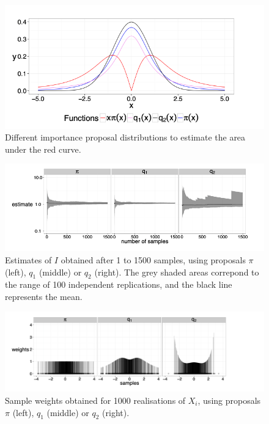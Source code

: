 \documentclass{article}
\begin{document}
\begin{figure}
    \centering
    \includegraphics[width=0.75\linewidth]{ox-hilary//simulation-methods//figures/NIS_dist.png}
    \caption{Different importance proposal distributions to estimate the area under the red curve.  
}
    \label{fig:nis_dist}
\end{figure}
\begin{figure}
    \centering
    \includegraphics[width=0.75\linewidth]{ox-hilary//simulation-methods//figures/NIS_burn_in.png}
    \caption{Estimates of $I$ obtained after 1 to 1500 samples, using proposals $\pi$ (left), $q_1$ (middle) or $q_2$ (right). The grey shaded areas correpond to the range of 100 independent replications, and the black line represents the mean.}
    \label{fig:nis_burn_in}
\end{figure}
\begin{figure}
    \centering
    \includegraphics[width=0.75\linewidth]{ox-hilary//simulation-methods//figures/NIS_weights.png}
    \caption{Sample weights obtained for 1000 realisations of $X_i$, using proposals $\pi$ (left), $q_1$ (middle) or $q_2$ (right).}
    \label{fig:nis_weights}
\end{figure}
\end{document}
